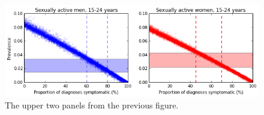 \documentclass{article}
\begin{document}
    \begin{figure}
        \begin{center}\includegraphics[width=15cm]{england_files/england_34_1.png}\end{center}
        \caption{The upper two panels from the previous figure.}
        \label{fig:prev_samples_byage}
    \end{figure}
    

    
    
    
    
\end{document}
